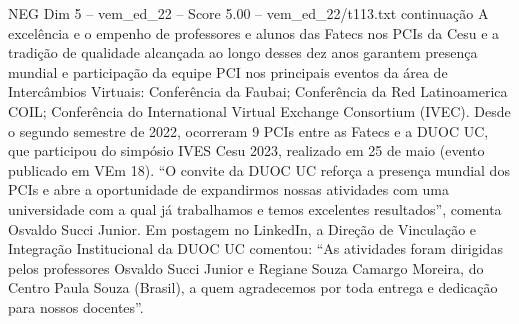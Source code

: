 \begin{textsample}{NEG Dim 5 – vem\_ed\_22 – Score 5.00 – vem\_ed\_22/t113.txt}  \label{ex:f5_neg_087}
continuação A excelência e o empenho de professores e alunos das Fatecs nos PCIs da Cesu e a tradição de qualidade alcançada ao longo desses dez anos garantem presença mundial e participação da equipe PCI nos principais eventos da área de Intercâmbios Virtuais: Conferência da Faubai; Conferência da Red Latinoamerica COIL; Conferência do International Virtual Exchange Consortium (IVEC).
Desde o segundo semestre de 2022, ocorreram 9 PCIs entre as Fatecs e a DUOC UC, que participou do simpósio IVES Cesu 2023, realizado em 25 de maio (evento publicado em VEm 18). “O convite da DUOC UC reforça a presença mundial dos PCIs e abre a oportunidade de expandirmos nossas atividades com uma universidade com a qual já trabalhamos e temos excelentes resultados”, comenta Osvaldo Succi Junior.
Em postagem no LinkedIn, a Direção de Vinculação e Integração Institucional da DUOC UC comentou: “As atividades foram dirigidas pelos professores Osvaldo Succi Junior e Regiane Souza Camargo Moreira, do Centro Paula Souza (Brasil), a quem agradecemos por toda entrega e dedicação para nossos docentes”.

\end{textsample}

